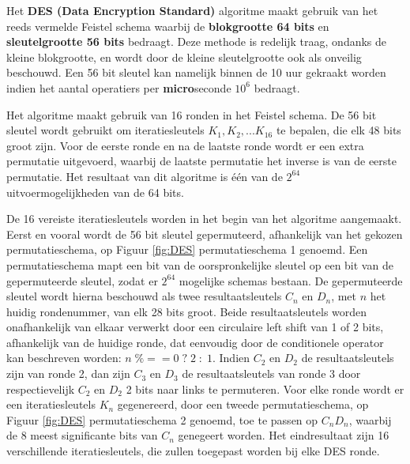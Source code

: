\documentclass{report}
\begin{document}
	Het \textbf{DES (Data Encryption Standard)} algoritme maakt gebruik van het reeds vermelde Feistel schema waarbij de \textbf{blokgrootte 64 bits} en \textbf{sleutelgrootte 56 bits} bedraagt. Deze methode is redelijk traag, ondanks de kleine blokgrootte, en wordt door de kleine sleutelgrootte ook als onveilig beschouwd. Een 56 bit sleutel kan namelijk binnen de 10 uur gekraakt worden indien het aantal operatiers per \textbf{micro}seconde $10^6$ bedraagt. 
	
	Het algoritme maakt gebruik van 16 ronden in het Feistel schema. De 56 bit sleutel wordt gebruikt om iteratiesleutels $K_1, K_2, ... K_{16}$ te bepalen, die elk 48 bits groot zijn. Voor de eerste ronde en na de laatste ronde wordt er een extra permutatie uitgevoerd, waarbij de laatste permutatie het inverse is van de eerste permutatie. Het resultaat van dit algoritme is één van de $2^{64}$ uitvoermogelijkheden van de 64 bits. 

	De 16 vereiste iteratiesleutels worden in het begin van het algoritme aangemaakt. Eerst en vooral wordt de 56 bit sleutel gepermuteerd, afhankelijk van het gekozen permutatieschema, op Figuur \ref{fig:DES} permutatieschema 1 genoemd. Een permutatieschema mapt een bit van de oorspronkelijke sleutel op een bit van de gepermuteerde sleutel, zodat er $2^{64}$ mogelijke schemas bestaan. De gepermuteerde sleutel wordt hierna beschouwd als twee resultaatsleutels $C_n$ en $D_n$, met $n$ het huidig rondenummer, van elk 28 bits groot. Beide resultaatsleutels worden onafhankelijk van elkaar verwerkt door een circulaire left shift van 1 of 2 bits, afhankelijk van de huidige ronde, dat eenvoudig door de conditionele operator kan beschreven worden: $n\;\% == 0\;?\;2\;:\;1$. Indien $C_2$ en $D_2$ de resultaatsleutels zijn van ronde 2, dan zijn $C_3$ en $D_3$ de resultaatsleutels van ronde 3 door respectievelijk $C_2$ en $D_2$ 2 bits naar links te permuteren. Voor elke ronde wordt er een iteratiesleutels $K_n$ gegenereerd, door een tweede permutatieschema, op Figuur \ref{fig:DES} permutatieschema 2 genoemd, toe te passen op $C_nD_n$, waarbij de 8 meest significante bits van $C_n$ genegeert worden. Het eindresultaat zijn 16 verschillende iteratiesleutels, die zullen toegepast worden bij elke DES ronde. 
\end{document}
